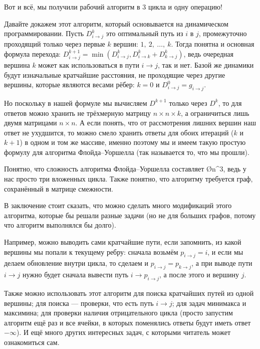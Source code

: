 Вот и всё, мы получили рабочий алгоритм в 3 цикла и одну операцию!

Давайте докажем этот алгоритм, который основывается на динамическом программировании. Пусть $D_{i \to j}^k$ это оптимальный путь из $i$ в $j$, промежуточно проходящий только через первые $k$ вершин: $1,\ 2,\ \ldots,\ k$. Тогда понятна и основная формула перехода: $D_{i \to j}^{k + 1} = \min( D_{i \to j}^k, D_{i \to k}^k + D_{k \to j}^{k})$, ведь очередная вершина $k$ может как использоваться в пути $i \to j$, так и нет. Базой же динамики будут изначальные кратчайшие расстояния, не проходящие через другие вершины, которые являются весами рёбер: $k = 0$ и $D_{i \to j}^0 = g_{i \to j}$.

Но поскольку в нашей формуле мы вычисляем $D^{k + 1}$ только через $D^k$, то для ответов можно хранить не трёхмерную матрицу $n \times n \times k$, а ограничиться лишь двумя матрицами $n \times n$. А если понять, что от рассмотрения лишних вершин наш ответ не ухудшится, то можно смело хранить ответы для обоих итераций ($k$ и $k + 1$) в одном и том же массиве, именно поэтому мы и имеем такую простую формулу для алгоритма Флойда–Уоршелла (так называется то, что мы прошли).

Понятно, что сложность алгоритма Флойда–Уоршелла составляет \O{n^3}, ведь у нас просто три вложенных цикла. Также понятно, что алгоритму требуется граф, сохранённый в матрице смежности.

В заключение стоит сказать, что можно сделать много модификаций этого алгоритма, которые бы решали разные задачи (но не для больших графов, потому что алгоритм выполнялся бы долго).

Например, можно выводить сами кратчайшие пути, если запомнить, из какой вершины мы попали к текущему ребру: сначала возьмём $p_{i \to j} = i$, и если мы делаем обновление внутри цикла, то сделаем и $p_{i \to j} = p_{k \to j}$, а при выводе пути $i \to j$ нужно будет сначала вывести путь $i \to p_{i \to j}$, а после этого и вершину $j$.

Также можно использовать этот алгоритм для поиска кратчайших путей из одной вершины; для поиска  — проверки, что есть путь $i \to j$; для задач минимакса и максимина; для проверки наличия отрицательного цикла (просто запустим алгоритм ещё раз и все ячейки, в которых поменялись ответы будут иметь ответ $-\infty$). И ещё много других интересных задач, с которыми читатель может ознакомиться сам.
